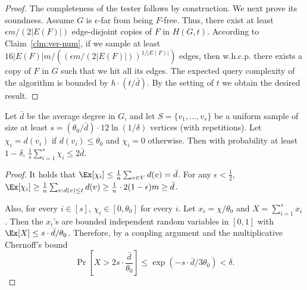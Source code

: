 \begin{proof}
The completeness of the tester follows by construction.
We next prove its soundness. Assume $G$ is $\epsilon$-far from being $F$-free.
Thus, there exist at least $\epsilon m/ (2|E(F)|)$ edge-disjoint copies of $F$ in $H(G, t)$.
According to Claim~\ref{clm:ver-num}, if we sample at least $16 |E(F)| m / ((\epsilon m/ (2|E(F)|))^{1/|E(F)|})$ edges, then w.h.c.p. there exists a copy of $F$ in $G$ such that we hit all its edges.
The expected query complexity of the algorithm is bounded by $h \cdot (t/\bar{d})$. By the setting of $t$ we obtain the desired result.
\end{proof}
\fi

% 
\begin{claim}\label{clm:average}
	Let $\bar{d}$ be the average degree in $G$, and 
	let $S=\{v_1, \ldots, v_s\}$ be a uniform sample of size at least $s=(\theta_0/\bar{d})\cdot 12\ln(1/\delta)$ vertices (with repetitions).
	Let $\chi_i=d(v_i)$ if $d(v_i)\leq \theta_0$ and $\chi_i=0$ otherwise.
	Then with probability at least $1-\delta$, $\frac{1}{s}\sum_{i=1}^s\chi_i\leq 2\bar{d}$.
\end{claim}

\begin{proof}
	It holds that $\Ex[\chi_i] \leq \frac{1}{n} \sum_{v \in V} d(v) = \bar{d}$.
	For any $\epsilon < \frac{1}{2}$, 
	$\Ex[\chi_i]\geq
	\frac{1}{n}\sum_{v : d(v) \leq t} d(v) 
	\geq \frac{1}{n}\cdot 2(1-\epsilon)m
	\geq \bar{d}$.
	
	Also, for every $i\in [s]$, $\chi_i\in [0,\theta_0]$ for every $i$. 
	Let $x_i=\chi/\theta_0$ and $X=\sum_{i=1}^s x_i$.
	Then the $x_i$'s are bounded independent   random variables in $[0,1]$ with $\Ex[X]\leq s\cdot \bar{d}/\theta_0$. Therefore, by  a coupling argument and the multiplicative Chernoff's bound
	\[
	\Pr\left[X > 2s\cdot \frac{\bar{d}}{\theta_0}\right] \leq  \exp\left( -s\cdot \bar{d}/3\theta_0 \right) < \delta.
	\]
\end{proof}